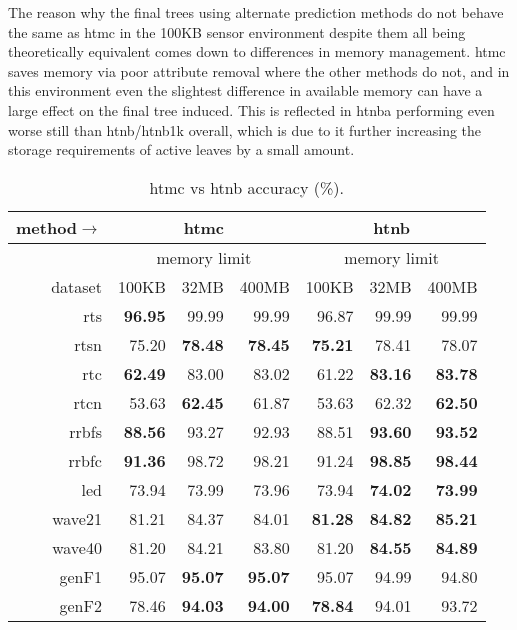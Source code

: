 The reason why the final trees using alternate prediction methods do not behave the same as {\sc htmc} in the 100KB sensor environment despite them all being theoretically equivalent comes down to differences in memory management. {\sc htmc} saves memory via poor attribute removal where the other methods do not, and in this environment even the slightest difference in available memory can have a large effect on the final tree induced. This is reflected in {\sc htnba} performing even worse still than {\sc htnb}/{\sc htnb1k} overall, which is due to it further increasing the storage requirements of active leaves by a small amount.  

\begin{table}
\caption{{\sc htmc} vs {\sc htnb} accuracy (\%).}
\label{tab:htmc_vs_htnb_acc}
\centering
\begin{tabular}{|r||r|r|r||r|r|r|}
\hline
method$\rightarrow$ & \multicolumn{3}{|c||}{{\sc htmc}} & \multicolumn{3}{|c|}{{\sc htnb}} \\
\hline
 & \multicolumn{3}{|c||}{memory limit} & \multicolumn{3}{|c|}{memory limit} \\
\hline
dataset & 100KB & 32MB & 400MB & 100KB & 32MB & 400MB \\
\hline
{\sc rts} & \textbf{96.95} & 99.99 & 99.99 & 96.87 & 99.99 & 99.99 \\
{\sc rtsn} & 75.20 & \textbf{78.48} & \textbf{78.45} & \textbf{75.21} & 78.41 & 78.07 \\
{\sc rtc} & \textbf{62.49} & 83.00 & 83.02 & 61.22 & \textbf{83.16} & \textbf{83.78} \\
{\sc rtcn} & 53.63 & \textbf{62.45} & 61.87 & 53.63 & 62.32 & \textbf{62.50} \\
{\sc rrbfs} & \textbf{88.56} & 93.27 & 92.93 & 88.51 & \textbf{93.60} & \textbf{93.52} \\
{\sc rrbfc} & \textbf{91.36} & 98.72 & 98.21 & 91.24 & \textbf{98.85} & \textbf{98.44} \\
{\sc led} & 73.94 & 73.99 & 73.96 & 73.94 & \textbf{74.02} & \textbf{73.99} \\
{\sc wave21} & 81.21 & 84.37 & 84.01 & \textbf{81.28} & \textbf{84.82} & \textbf{85.21} \\
{\sc wave40} & 81.20 & 84.21 & 83.80 & 81.20 & \textbf{84.55} & \textbf{84.89} \\
{\sc genF1} & 95.07 & \textbf{95.07} & \textbf{95.07} & 95.07 & 94.99 & 94.80 \\
{\sc genF2} & 78.46 & \textbf{94.03} & \textbf{94.00} & \textbf{78.84} & 94.01 & 93.72 \\

\end{tabular}
\end{table}

